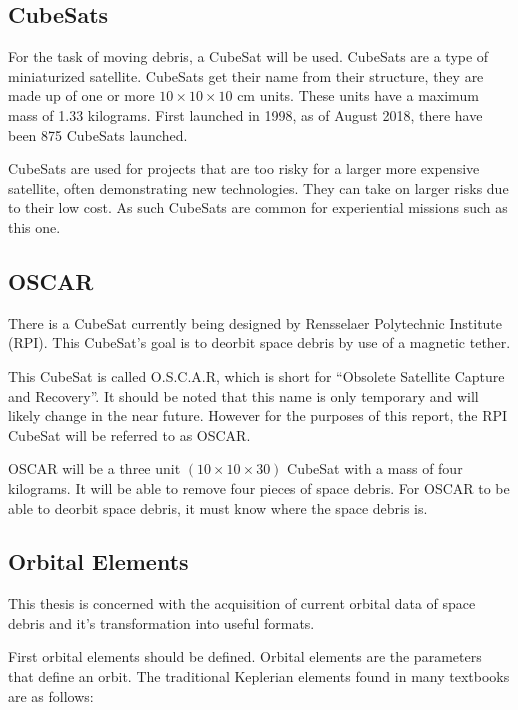 \documentclass[12pt]{article}
\begin{document}
	\subsection{CubeSats}
	For the task of moving debris, a CubeSat will be used. CubeSats are a type of miniaturized satellite. CubeSats get their name from their structure, they are made up of one or more $10\times10\times10$ cm units.	These units have a maximum mass of 1.33 kilograms. First launched in 1998, as of August 2018, there have been 875 CubeSats launched\cite{nanosats_eu}. \par 
	
	
	
	CubeSats are used for projects that are too risky for a larger more expensive satellite, often demonstrating new technologies. They can take on larger risks due to their low cost. As such CubeSats are common for experiential missions such as this one.
	
	\subsection{OSCAR}
	There is a CubeSat currently being designed by Rensselaer Polytechnic Institute (RPI). This CubeSat's goal is to deorbit space debris by use of a magnetic tether. \par 
	
	
	This CubeSat is called O.S.C.A.R, which is short for “Obsolete Satellite Capture and Recovery”. It should be noted that this name is only temporary and will likely change in the near future. However for the purposes of this report, the RPI CubeSat will be referred to as OSCAR.\par 
	
	OSCAR will be a three unit  $(10\times10\times30)$ CubeSat with a mass of four kilograms. It will be able to remove four pieces of space debris.\cite{paulT} For OSCAR to be able to deorbit space debris, it must know where the space debris is. 
	
	\subsection{Orbital Elements}
	
	This thesis is concerned with the acquisition of current orbital data of space debris and it's transformation into useful formats. 
	
	First orbital elements should be defined. Orbital elements are the parameters that define an orbit. The traditional Keplerian elements found in many textbooks are as follows: 
	
\end{document}
